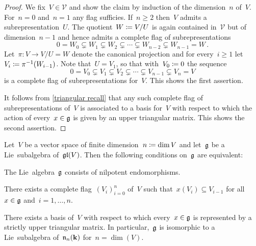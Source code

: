 \begin{proof}
  We fix~$V \in \mathcal{V}$ and show the claim by induction of the dimension~$n$ of~$V$.
  For~$n = 0$ and~$n = 1$ any flag sufficies.
  If~$n \geq 2$ then~$V$ admits a {\onedimensional} subrepresentation~$U$.
  The quotient~$W \coloneqq V/U$ is again contained in~$\mathcal{V}$ but of dimension~$n-1$ and hence admits a complete flag of subrepresentations
  \[
    0
    =
    W_0
    \subsetneq
    W_1
    \subsetneq
    W_2
    \subsetneq
    \dotsb
    \subsetneq
    W_{n-2}
    \subsetneq
    W_{n-1}
    =
    W \,.
  \]
  Let~$\pi \colon V \to V/U = W$ denote the canonical projection and for every~$i \geq 1$ let~$V_i \coloneqq \pi^{-1}(W_{i-1})$.
  Note that~$U = V_1$, so that with~$V_0 \coloneqq 0$ the sequence
  \[
    0
    =
    V_0
    \subsetneq
    V_1
    \subsetneq
    V_2
    \subsetneq
    \dotsb
    \subsetneq
    V_{n-1}
    \subsetneq
    V_n
    =
    V
  \]
  is a complete flag of subrepresentations for~$V$.
  This shows the first assertion.
  
  It follows from \cref{triangular recall} that any such complete flag of subrepresentations of~$V$ is associated to a basis for~$V$ with respect to which the action of every~$x \in \mathfrak{g}$ is given by an upper triangular matrix.
  This shows the second assertion.
\end{proof}


\begin{proposition}
  \label{characterizations of linear lie algebras consisting of nilpotent endomorphisms}
  Let~$V$ be a vector space of finite dimension~$n \coloneqq \dim V$ and let~$\mathfrak{g}$ be a Lie~subalgebra of~$\mathfrak{gl}(V)$.
  Then the following conditions on~$\mathfrak{g}$ are equivalent:
  \begin{equivalenceslist}
    \item
      \label{engels g consists of nilpotent endomorphisms}
      The Lie~algebra~$\mathfrak{g}$ consists of nilpotent endomorphisms.
    \item
      \label{engels there exists a complete flag shifted by g}
      There exists a complete flag~$(V_i)_{i=0}^n$ of~$V$ such that~$x(V_i) \subseteq V_{i-1}$ for all~$x \in \mathfrak{g}$ and~$i = 1, \dotsc, n$.
    \item
      \label{engels represented by strictly upper triangular matrices}
      There exists a basis of~$V$ with respect to which every~$x \in \mathfrak{g}$ is represented by a strictly upper triangular matrix.
      In particular,~$\mathfrak{g}$ is isomorphic to a Lie~subalgebra of~$\mathfrak{n}_n(\mathbf{k})$ for~$n = \dim(V)$.
  \end{equivalenceslist}
\end{proposition}


